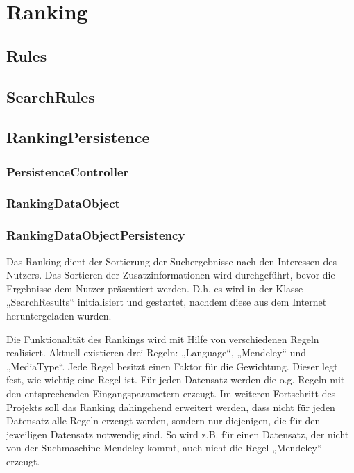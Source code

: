 
\section{Ranking}
\subsection{Rules}
\subsection{SearchRules}
\subsection{RankingPersistence}
\subsubsection{PersistenceController}
\subsubsection{RankingDataObject}
\subsubsection{RankingDataObjectPersistency}

Das Ranking dient der Sortierung der Suchergebnisse nach den Interessen des Nutzers. Das Sortieren der Zusatzinformationen wird durchgeführt, bevor die Ergebnisse dem Nutzer präsentiert werden. D.h. es wird in der Klasse „SearchResults“ initialisiert und gestartet, nachdem diese aus dem Internet heruntergeladen wurden.

Die Funktionalität des Rankings wird mit Hilfe von verschiedenen Regeln realisiert. Aktuell existieren drei Regeln: „Language“, „Mendeley“ und „MediaType“. Jede Regel besitzt einen Faktor für die Gewichtung. Dieser legt fest, wie wichtig eine Regel ist. Für jeden Datensatz werden die o.g. Regeln mit den entsprechenden Eingangsparametern erzeugt. Im weiteren Fortschritt des Projekts soll das Ranking dahingehend erweitert werden, dass nicht für jeden Datensatz alle Regeln erzeugt werden, sondern nur diejenigen, die für den jeweiligen Datensatz notwendig sind. So wird z.B. für einen Datensatz, der nicht von der Suchmaschine Mendeley kommt, auch nicht die Regel „Mendeley“ erzeugt. 

